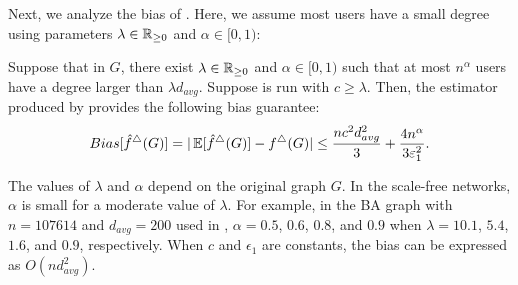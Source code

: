Next, we analyze the bias of \AlgWSTriVR{}. Here, we assume most users have a small degree 
using parameters $\lambda \in \mathbb{R}_{\ge0}$ and $\alpha \in [0,1)$: 

\begin{theorem}
\label{chap3-thm:bias_II_ast}
  Suppose that in $G$, there exist $\lambda \in \mathbb{R}_{\ge0}$ and $\alpha \in [0,1)$
  such that at most $n^\alpha$ users have a degree larger than
  $\lambda d_{avg}$. Suppose \AlgWSTriVR{} is run with $c \geq \lambda$.
  Then, the estimator produced by
  \AlgWSTriVR{} provides the following bias guarantee:
\begin{align}
    Bias[\hat{f}^\triangle(G)]
    = |\operatorname{\mathbb{E}}[\hat{f}^\triangle(G)] - f^\triangle(G)|
    \leq
    \frac{n c^2 d_{avg}^2}{3} +
    \frac{4 n^\alpha}{3 \varepsilon_1^2}.
    \label{chap3-eq:thm:bias_II_ast}
\end{align}
\end{theorem}
The values of $\lambda$ and $\alpha$ depend on the original graph $G$.
In the scale-free networks, $\alpha$ is small for a moderate value of $\lambda$.
For example, in the BA graph with $n=107614$ and $d_{avg}=200$ used in , $\alpha = 0.5$, $0.6$, $0.8$, and $0.9$ when $\lambda = 10.1$, $5.4$, $1.6$, and $0.9$, respectively.
When $c$ and $\epsilon_1$ are constants,
the bias can be expressed as $O(n d_{avg}^2)$.

